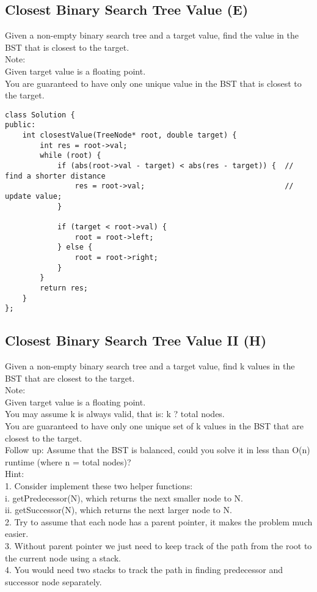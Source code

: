 \subsection{Closest Binary Search Tree Value (E)}
Given a non-empty binary search tree and a target value, find the value in the BST that is closest to the target.\\

Note:\\
    Given target value is a floating point.\\
    You are guaranteed to have only one unique value in the BST that is closest to the target.\\

\begin{lstlisting}
class Solution {
public:
    int closestValue(TreeNode* root, double target) {
        int res = root->val;
        while (root) {
            if (abs(root->val - target) < abs(res - target)) {  // find a shorter distance
                res = root->val;                                // update value;
            }
            
            if (target < root->val) {
                root = root->left;
            } else {
                root = root->right;
            }
        }
        return res;
    }
};
\end{lstlisting}


\subsection{Closest Binary Search Tree Value II (H)}
Given a non-empty binary search tree and a target value, find k values in the BST that are closest to the target.\\

Note:\\
    Given target value is a floating point.\\
    You may assume k is always valid, that is: k ? total nodes.\\
    You are guaranteed to have only one unique set of k values in the BST that are closest to the target.\\

Follow up:
Assume that the BST is balanced, could you solve it in less than O(n) runtime (where n = total nodes)?\\

Hint:\\
1. Consider implement these two helper functions:\\
i. getPredecessor(N), which returns the next smaller node to N.\\
ii. getSuccessor(N), which returns the next larger node to N.\\
2. Try to assume that each node has a parent pointer, it makes the problem much easier.\\
3. Without parent pointer we just need to keep track of the path from the root to the current node using a stack.\\
4. You would need two stacks to track the path in finding predecessor and successor node separately.\\

